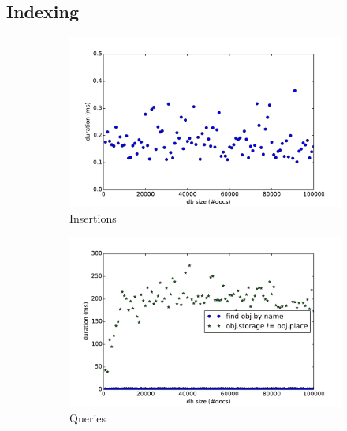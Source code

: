 \subsection{Indexing}
\label{sec:indexing}
\begin{figure}[ht!]
  \centering
  \begin{subfigure}[b]{0.49\textwidth}
    \hspace{-8mm}
    \includegraphics[width=1.15\textwidth]{plots/insert-durations-index}
    \caption{Insertions}
    \label{fig:insert-index}
  \end{subfigure}
  \begin{subfigure}[b]{0.49\textwidth}
    \hspace{-3mm}
    \includegraphics[width=1.15\textwidth]{plots/query-durations-index}
    \caption{Queries}
    \label{fig:query-index}
  \end{subfigure}
  \begin{subfigure}[b]{0.49\textwidth}
    \hspace{-8mm}

\end{subfigure}
\end{figure}

